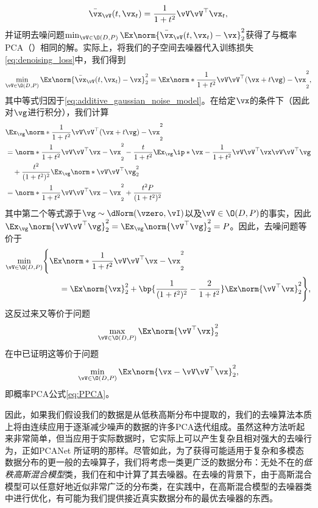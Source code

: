 \documentclass[../../book-main_zh.tex]{subfiles}
\begin{document}
\begin{equation}\label{eq:optimal nn}
    \bar{\vx}_{\vV}(t, \vx_{t}) = \frac{1}{1 + t^{2}}\vV\vV^{\top}\vx_{t},
\end{equation}
并证明去噪问题\(\min_{\vV \in \O(D,
    P)}\Ex\norm{\bar{\vx}_{\vV}(t, \vx_{t}) -
\vx}_{2}^{2}\)获得了与概率PCA（）相同的解。实际上，将我们的子空间去噪器代入训练损失\eqref{eq:denoising_loss}中，我们得到
\begin{equation}
    \min_{\vV \in \O(D, P)}\Ex\norm{\bar{\vx}_{\vV}(t,
    \vx_{t}) - \vx}_{2}^{2} = \Ex\norm*{\frac{1}{1 +
    t^{2}}\vV\vV^{\top}(\vx + t\vg) - \vx}_{2}^{2},
\end{equation}
其中等式归因于\eqref{eq:additive_gaussian_noise_model}。在给定\(\vx\)的条件下（因此对\(\vg\)进行积分），我们计算
\begin{align}
    & \Ex_{\vg}\norm*{\frac{1}{1 + t^{2}}\vV\vV^{\top}(\vx + t\vg) -
    \vx}_{2}^{2} \\
    &= \norm*{\frac{1}{1 + t^{2}}\vV\vV^{\top}\vx - \vx}_{2}^{2} -
    \frac{t}{1+t^2}\Ex_{\vg} \ip*{\vx - \frac{1}{1 +
    t^{2}}\vV\vV^{\top}\vx}{\vV\vV^{\top}\vg} \\
    &\quad + \frac{t^2}{(1+t^2)^2} \Ex_{\vg}\norm*{\vV\vV^{\top} \vg}_{2}^{2} \\
    &= \norm*{\frac{1}{1 + t^{2}}\vV\vV^{\top}\vx - \vx}_{2}^{2} +
    \frac{t^2P}{(1+t^2)^2}
\end{align}
其中第二个等式源于\(\vg \sim \dNorm(\vzero,
\vI)\)以及\(\vV \in \O(D, P)\)的事实，因此\(
    \Ex_{\vg}\norm{\vV\vV^\top
    \vg}_{2}^{2} =
\Ex_{\vg}\norm{\vV^\top \vg}_{2}^{2} = P\)。因此，去噪问题等价于
\begin{align}
    \min_{\vV \in \O(D, P)} & \Bigg\{\Ex \norm*{\frac{1}{1 +
        t^{2}}\vV\vV^{\top}\vx - \vx}_{2}^{2} \\
        & \qquad = \Ex\norm{\vx}_{2}^{2} + \bp{\frac{1}{(1 +
            t^{2})^{2}} - \frac{2}{1 +
    t^{2}}}\Ex\norm{\vV^{\top}\vx}_{2}^{2}\Bigg\},
\end{align}
这反过来又等价于问题
\begin{equation}\label{eq:PCA}
    \max_{\vV \in \O(D, P)}\Ex\norm{\vV^{\top}\vx}_{2}^{2}
\end{equation}
在中已证明这等价于问题
\begin{equation}
    \min_{\vV \in \O(D, P)}\Ex\norm{\vx - \vV\vV^{\top}\vx}_{2}^{2},
\end{equation}
即概率PCA公式\eqref{eq:PPCA}。

因此，如果我们假设我们的数据是从低秩高斯分布中提取的，我们的去噪算法本质上将由连续应用于逐渐减少噪声的数据的许多PCA迭代组成。虽然这种方法听起来非常简单，但当应用于实际数据时，它实际上可以产生复杂且相对强大的去噪行为，正如PCANet \parencite{chan2015pcanet}所证明的那样。尽管如此，为了获得可能适用于复杂和多模态数据分布的更一般的去噪算子，我们将考虑一类更广泛的数据分布：无处不在的\textit{低秩高斯混合模型}类，我们在和中计算了其去噪器。在去噪的背景下，由于高斯混合模型可以任意好地近似非常广泛的分布类，在实践中，在高斯混合模型的去噪器类中进行优化，有可能为我们提供接近真实数据分布的最优去噪器的东西。
\end{document}

